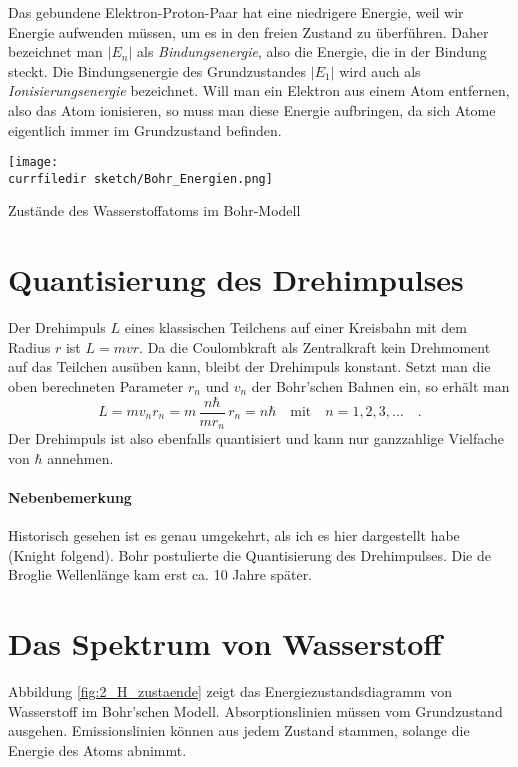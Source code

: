Das gebundene Elektron-Proton-Paar hat eine niedrigere Energie, weil wir Energie aufwenden müssen, um es in den freien Zustand zu überführen. Daher bezeichnet man $|E_n|$ als \emph{Bindungsenergie}, also die Energie, die in der Bindung steckt. Die Bindungsenergie des Grundzustandes $|E_1|$ wird auch als \emph{Ionisierungsenergie} bezeichnet. Will man ein Elektron aus einem Atom entfernen, also das Atom ionisieren, so muss man diese Energie aufbringen, da sich Atome eigentlich immer im Grundzustand befinden. 

\begin{marginfigure}
    \texttt{[image: \\currfiledir sketch/Bohr\_Energien.png]}
    \caption{Zustände des Wasserstoffatoms im Bohr-Modell}
    \label{fig:2_H_zustaende}
 \end{marginfigure}


\section{Quantisierung des Drehimpulses}

Der Drehimpuls $L$ eines klassischen Teilchens auf einer Kreisbahn mit dem Radius $r$ ist $L = m v r$.
Da die Coulombkraft als Zentralkraft kein Drehmoment auf das Teilchen ausüben kann, bleibt der Drehimpuls konstant. Setzt man die oben berechneten Parameter $r_n$ und $v_n$ der Bohr'schen Bahnen ein, so erhält man
\begin{equation}
    L = m v_n r_n = m  \, \frac{n \hbar}{m r_n} \, r_n = n \hbar \quad \text{mit} \quad n = 1, 2, 3, \dots \quad .
\end{equation}
Der Drehimpuls ist also ebenfalls quantisiert und kann nur ganzzahlige Vielfache von $\hbar$ annehmen.

\paragraph*{Nebenbemerkung} Historisch gesehen ist es genau umgekehrt, als ich es hier dargestellt habe (Knight folgend). Bohr postulierte die Quantisierung des Drehimpulses. Die de Broglie Wellenlänge kam erst ca. 10 Jahre später.


\section{Das Spektrum von Wasserstoff}

Abbildung \ref{fig:2_H_zustaende} zeigt das Energiezustandsdiagramm von Wasserstoff im Bohr'schen Modell. Absorptionslinien müssen vom Grundzustand ausgehen. Emissionslinien können aus jedem Zustand stammen, solange die Energie des Atoms abnimmt.

